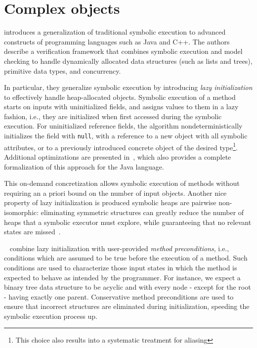 
\section{Complex objects}

\cite{KPV-TACAS03} introduces a generalization of traditional symbolic execution to advanced constructs of programming languages such as Java and C++. The authors describe a verification framework that combines symbolic execution and model checking to handle dynamically allocated data structures (such as lists and trees), primitive data types, and concurrency.

In particular, they generalize symbolic execution by introducing {\em lazy initialization} to effectively handle heap-allocated objects. Symbolic execution of a method starts on inputs with uninitialized fields, and assigns values to them in a lazy fashion, i.e., they are initialized when first accessed during the symbolic execution. For uninitialized reference fields, the algorithm nondeterministically initializes the field with {\tt null}, with a reference to a new object with all symbolic attributes, or to a previously introduced concrete object of the desired type\footnote{This choice also results into a systematic treatment for aliasing}. Additional optimizations are presented in~\cite{DLR-ASE12}, which also provides a complete formalization of this approach for the Java language.

This on-demand concretization allows symbolic execution of methods without requiring an a priori bound on the number of input objects. Another nice property of lazy initialization is produced symbolic heaps are pairwise non-isomorphic: eliminating symmetric structures can greatly reduce the number of heaps that a symbolic executor must explore, while guaranteeing that no relevant states are missed~\cite{BLISS-TSE15}. 

~\cite{KPV-TACAS03,SPF-ISSTA04} combine lazy initialization with user-provided {\em method preconditions}, i.e., conditions which are assumed to be true before the execution of a method. Such conditions are used to characterize those input states in which the method is expected to behave as intended by the programmer. For instance, we expect a binary tree data structure to be acyclic and with every node - except for the root - having exactly one parent. Conservative method preconditions are used to ensure that incorrect structures are eliminated during initialization, speeding the symbolic execution process up.

